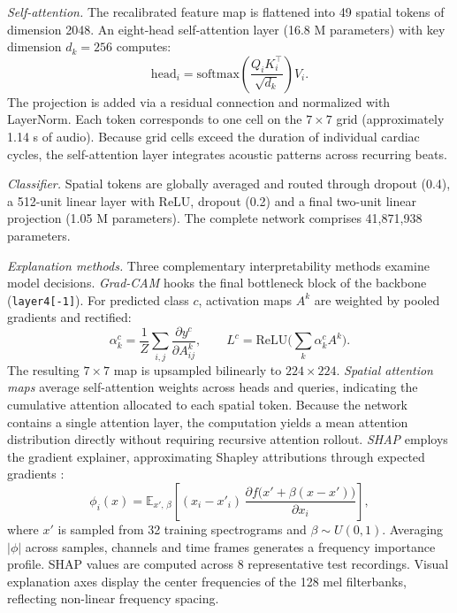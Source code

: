 \documentclass[conference]{IEEEtran}
\begin{document}
\textit{Self-attention.} The recalibrated feature map is flattened into 49 spatial tokens of dimension 2048. An eight-head self-attention layer \cite{vaswani} (16.8 M parameters) with key dimension $d_k=256$ computes:
\begin{equation}
\mathrm{head}_i = \mathrm{softmax}\!\left(\frac{Q_iK_i^{\top}}{\sqrt{d_k}}\right)V_i.
\end{equation}
The projection is added via a residual connection and normalized with LayerNorm. Each token corresponds to one cell on the $7\times7$ grid (approximately 1.14 s of audio). Because grid cells exceed the duration of individual cardiac cycles, the self-attention layer integrates acoustic patterns across recurring beats.

\textit{Classifier.} Spatial tokens are globally averaged and routed through dropout (0.4), a 512-unit linear layer with ReLU, dropout (0.2) and a final two-unit linear projection (1.05 M parameters). The complete network comprises 41,871,938 parameters.

\textit{Explanation methods.} Three complementary interpretability methods examine model decisions. \emph{Grad-CAM} \cite{selvaraju} hooks the final bottleneck block of the backbone (\texttt{layer4[-1]}). For predicted class $c$, activation maps $A^k$ are weighted by pooled gradients and rectified:
\begin{equation}
\alpha^c_k = \frac{1}{Z}\sum_{i,j}\frac{\partial y^c}{\partial A^k_{ij}},\qquad L^c = \mathrm{ReLU}\Big(\sum_k \alpha^c_k A^k\Big).
\end{equation}
The resulting $7\times7$ map is upsampled bilinearly to $224\times224$. \emph{Spatial attention maps} average self-attention weights across heads and queries, indicating the cumulative attention allocated to each spatial token. Because the network contains a single attention layer, the computation yields a mean attention distribution directly without requiring recursive attention rollout. \emph{SHAP} employs the gradient explainer, approximating Shapley attributions through expected gradients \cite{lundberg}:
\begin{equation}
\phi_i(x) = \mathbb{E}_{x',\,\beta}\!\left[(x_i - x'_i)\,\frac{\partial f\big(x' + \beta(x-x')\big)}{\partial x_i}\right],
\end{equation}
where $x'$ is sampled from 32 training spectrograms and $\beta\sim U(0,1)$. Averaging $|\phi|$ across samples, channels and time frames generates a frequency importance profile. SHAP values are computed across 8 representative test recordings. Visual explanation axes display the center frequencies of the 128 mel filterbanks, reflecting non-linear frequency spacing.
\end{document}
